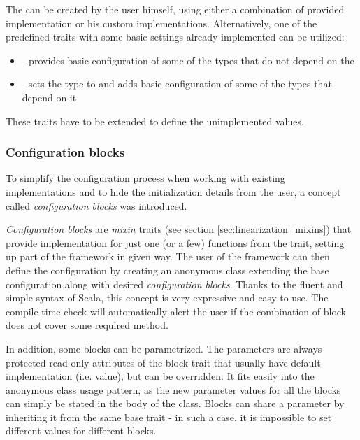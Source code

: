 The  can be created by the user himself, using either a combination of provided implementation or his custom implementations. Alternatively, one of the predefined  traits with some basic settings already implemented can be utilized:

\begin{itemize}
	\item {} - provides basic configuration of some of the types that do not depend on the 
	\item {} - sets the  type to  and adds basic configuration of some of the types that depend on it
\end{itemize}

These traits have to be extended to define the unimplemented values.

\subsubsection{Configuration blocks}
 To simplify the configuration process when working with existing implementations and to hide the initialization details from the user, a concept called \textit{configuration blocks} was introduced. 
 
 \textit{Configuration blocks} are \textit{mixin} traits (see section \ref{sec:linearization_mixins}) that provide implementation for just one (or a few) functions from the  trait, setting up part of the framework in given way. The user of the framework can then define the configuration by creating an anonymous class extending the base configuration along with desired \textit{configuration blocks}. Thanks to the fluent and simple syntax of Scala, this concept is very expressive and easy to use. The compile-time check will automatically alert the user if the combination of block does not cover some required method.
 
 In addition, some blocks can be parametrized. The parameters are always protected read-only attributes of the block trait that usually have default implementation (i.e. value), but can be overridden. It fits easily into the anonymous class usage pattern, as the new parameter values for all the blocks can simply be stated in the body of the class. Blocks can share a parameter by inheriting it from the same base trait - in such a case, it is impossible to set different values for different blocks.
 
